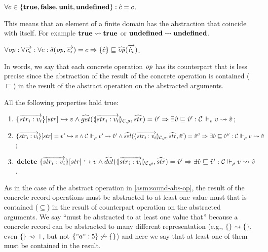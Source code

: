 \begin{assumption}
\label{asm:finite}
$\forall c \in \{\mathbf{true},\mathbf{false},\mathbf{unit},\mathbf{undefined}\}: \hat{c} = c$.
\end{assumption}
This means that an element of a finite domain has the abstraction that coincide with itself. For example $\mathbf{true} \rightsquigarrow \mathbf{true}$ or $\mathbf{undefined} \rightsquigarrow \mathbf{undefined}$.

\begin{assumption}
\label{asm:sound-abs-op}
$\forall \mathit{op}: \forall \overrightarrow{c_i}: \forall c: \delta(\mathit{op},\overrightarrow{c_i}) = c \Rightarrow \{\hat{c}\} \sqsubseteq \widehat{\mathit{op}}(\overrightarrow{{\hat{c}_i}})$.
\end{assumption}
In words, we say that each concrete operation $\mathit{op}$ has its counterpart that is less precise since the abstraction of the result of the concrete operation is contained ($\sqsubseteq$) in the result of the abstract operation on the abstracted arguments.

\begin{assumption}
\label{asm:sound-abs-records}
All the following properties hold true:
\begin{enumerate}
\item $\{\overrightarrow{str_i:v_i}\}[str] \hookrightarrow v \wedge \widehat{get}(\langle\!| \overrightarrow{str_i:v_i} |\!\rangle_{{\cal C},\rho},\widehat{str}) = \hat{v}' \Rightarrow \exists \hat{v} \sqsubseteq \hat{v}': {\cal C} \Vdash_{\rho} v \rightsquigarrow \hat{v}$;
\item $\{\overrightarrow{str_i:v_i}\}[str] = v' \hookrightarrow v \wedge {\cal C} \Vdash_{\rho} v' \rightsquigarrow \hat{v}' \wedge \widehat{set}(\langle\!| \overrightarrow{str_i:v_i} |\!\rangle_{{\cal C},\rho},\widehat{str},\hat{v}') = \hat{v}'' \Rightarrow \exists \hat{v} \sqsubseteq \hat{v}'': {\cal C} \Vdash_{\rho} v \rightsquigarrow \hat{v}$;
\item $\mathbf{delete}\ \{\overrightarrow{str_i:v_i}\}[str] \hookrightarrow v \wedge \widehat{del}(\langle\!| \overrightarrow{str_i:v_i} |\!\rangle_{{\cal C},\rho},\widehat{str}) = \hat{v}' \Rightarrow \exists \hat{v} \sqsubseteq \hat{v}': {\cal C} \Vdash_{\rho} v \rightsquigarrow \hat{v}$.
\end{enumerate}
\end{assumption}
As in the case of the abstract operation in \ref{asm:sound-abs-op}, the result of the concrete record operations must be abstracted to at least one value must that is contained ($\subseteq$) in the result of counterpart operation on the abstracted arguments. We say ``must be abstracted to at least one value that'' because a concrete record can be abstracted to many different representation (e.g., $\{\}\rightsquigarrow \{\}$, even $\{\} \rightsquigarrow \top$, but not $\{"a":5\} \not\rightsquigarrow \{\}$) and here we say that at least one of them must be contained in the result.

